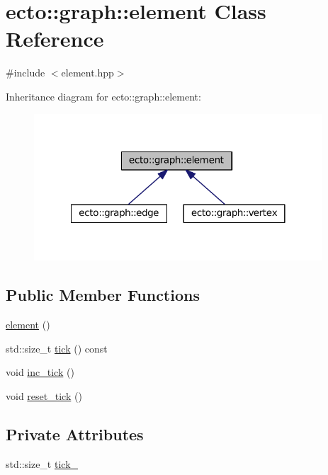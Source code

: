 \hypertarget{classecto_1_1graph_1_1element}{\section{ecto\-:\-:graph\-:\-:element Class Reference}
\label{classecto_1_1graph_1_1element}
}


{\ttfamily \#include $<$element.\-hpp$>$}



Inheritance diagram for ecto\-:\-:graph\-:\-:element\-:\nopagebreak
\begin{figure}[H]
\begin{center}
\leavevmode
\includegraphics[width=305pt]{classecto_1_1graph_1_1element__inherit__graph}
\end{center}
\end{figure}
\subsection*{Public Member Functions}
\begin{DoxyCompactItemize}
\item 
\hyperlink{classecto_1_1graph_1_1element_abf5d2137a1fd29f25af2b8f6bd0397df}{element} ()
\item 
std\-::size\-\_\-t \hyperlink{classecto_1_1graph_1_1element_a966b0c7cd87bdc5c5787d9b110966d8f}{tick} () const 
\item 
void \hyperlink{classecto_1_1graph_1_1element_a5d5b283bacb5371285e27c0f42e54985}{inc\-\_\-tick} ()
\item 
void \hyperlink{classecto_1_1graph_1_1element_a6417601ffd8159b6e00f2ff57eda1b99}{reset\-\_\-tick} ()
\end{DoxyCompactItemize}
\subsection*{Private Attributes}
\begin{DoxyCompactItemize}
\item 
std\-::size\-\_\-t \hyperlink{classecto_1_1graph_1_1element_a6f850cead9edb37941344fdbd40ae112}{tick\-\_\-}
\end{DoxyCompactItemize}


